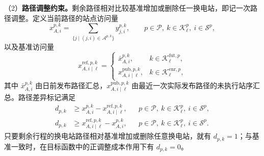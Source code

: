 \documentclass[12pt,a4paper,UTF8]{ctexart}
\begin{document}
（2）\textbf{路径调整约束。}剩余路径相对比较基准增加或删除任一换电站，即记一次路径调整。定义当前路径的站点访问量
\begin{equation}
x_{A,i}^{p,k}
=
\sum_{\{j\mid(j,i)\in\mathcal A^{p,k}\}}y_{j,i}^{p,k},
\qquad p\in\mathcal P,\ k\in\mathcal K_\ell^p,\ i\in\mathcal S^p,
\label{eq:station_visit_indicator}
\end{equation}
以及基准访问量
\begin{equation}
x_{A,i\mid\ell}^{\mathrm{ref},p,k}
=
\begin{cases}
\bar x_{A,i}^{p,k},
&k\in\mathcal K_\ell^{\mathrm{fut},p},\\
x_{A,i\mid\ell}^{\mathrm{pub},p,k},
&k\in\mathcal K_\ell^{\mathrm{enr},p},
\end{cases}
\label{eq:reference_visit_indicator}
\end{equation}
其中 $\bar x_{A,i}^{p,k}$ 由日前发布路径汇总，$x_{A,i\mid\ell}^{\mathrm{pub},p,k}$ 由最近一次实际发布路径的未执行站序汇总。路径差异标记满足
\begin{subequations}
\label{eq:path_adjustment_indicator}
\begin{align}
d_{p,k}
&\ge x_{A,i}^{p,k}-x_{A,i\mid\ell}^{\mathrm{ref},p,k},
&&p\in\mathcal P,\ k\in\mathcal K_\ell^p,\ i\in\mathcal S^p,\\
d_{p,k}
&\ge x_{A,i\mid\ell}^{\mathrm{ref},p,k}-x_{A,i}^{p,k},
&&p\in\mathcal P,\ k\in\mathcal K_\ell^p,\ i\in\mathcal S^p.
\end{align}
\end{subequations}
只要剩余行程的换电站路径相对基准增加或删除任意换电站，就有 $d_{p,k}=1$；与基准一致时，在目标函数中的正调整成本作用下有 $d_{p,k}=0$。
\end{document}
